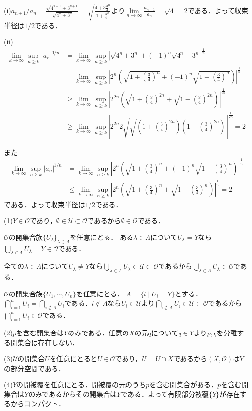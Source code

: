 \documentclass[
		book,
		head_space=20mm,
		foot_space=20mm,
		gutter=10mm,
		line_length=190mm
]{jlreq}
\begin{document}
(i)$a_{n+1}/a_n=\frac{\sqrt{4^{n+1}+3^{n+1}}}{\sqrt{4^{n}+3^{n}}}=\sqrt{\frac{4+3\frac{3}{4}^{n}}{1+\frac{3}{4}^{n}}}$より$\lim\limits_{n \to \infty} \frac{a_{n+1}}{a_n}=\sqrt{4}=2$である．よって収束半径は$1/2$である．

(ii)\begin{align}
    \lim\limits_{k \to \infty}\sup\limits_{n \ge k}{|a_n|}^{1/n}&=\lim\limits_{k \to \infty}\sup\limits_{n \ge k}\left|{\sqrt{4^{n}+3^{n}}+(-1)^{n}\sqrt{4^{n}-3^{n}}}\right|^\frac{1}{n}  \\
    &= \lim\limits_{k \to \infty}\sup\limits_{n \ge k}\left|{2^n(\sqrt{1+(\frac{3}{4})^n}+(-1)^n\sqrt{1-(\frac{3}{4})^n})}\right|^\frac{1}{n} \\
    &\ge \lim\limits_{k \to \infty}\sup\limits_{n \ge k}\left|{2^{2n}(\sqrt{1+(\frac{3}{4})^{2n}}+\sqrt{1-(\frac{3}{4})^{2n}})}\right|^\frac{1}{2n} \\
    &\ge \lim\limits_{k \to \infty}\sup\limits_{n \ge k}\left|{2^{2n}2\sqrt{\sqrt{(1+(\frac{3}{4})^{2n})(1-(\frac{3}{4})^{2n})}}}\right|^\frac{1}{2n} =2
\end{align}

また \begin{align}
    \lim\limits_{k \to \infty}\sup\limits_{n \ge k}{|a_n|}^{1/n}&= \lim\limits_{k \to \infty}\sup\limits_{n \ge k}\left|{2^n(\sqrt{1+(\frac{3}{4})^n}+(-1)^n\sqrt{1-(\frac{3}{4})^n})}\right|^\frac{1}{n} \\
    &\le \lim\limits_{k \to \infty}\sup\limits_{n \ge k}\left|{2^n(\sqrt{1+(\frac{3}{4})^n}+\sqrt{1-(\frac{3}{4})^n})}\right|^\frac{1}{n} = 2
\end{align}である．よって収束半径は$1/2$である．


(1)$Y \in \mathcal{O}$であり，$\emptyset \in \mathcal{U} \subset \mathcal{O}$であるから$\emptyset \in \mathcal{O}$である．

$\mathcal{O}$の開集合族$\{U_\lambda\}_{\lambda\in \Lambda}$を任意にとる．
ある$\lambda\in \Lambda$について$U_\lambda=Y$なら$\bigcup_{\lambda\in \Lambda}U_\lambda=Y \in \mathcal{O}$である．

全ての$\lambda \in \Lambda$について$U_\lambda \neq Y$なら$\bigcup_{\lambda\in \Lambda}U_\lambda \in \mathcal{U}\subset \mathcal{O}$であるから$\bigcup_{\lambda\in \Lambda}U_\lambda \in \mathcal{O}$である．

$\mathcal{O}$の開集合族$\{U_1,\cdots,U_n\}$を任意にとる．
$A=\{ i \mid U_i=Y\}$とする．$\bigcap\limits_{i=1}^n U_i=\bigcap\limits_{i\notin A}U_i $である．$i\notin A$なら$U_i \in \mathcal{U}$より$\bigcap\limits_{i\notin A}U_i  \in \mathcal{U}\subset \mathcal{O}$であるから$\bigcap\limits_{i=1}^n U_i \in \mathcal{O}$である．

(2)$p$を含む開集合は$Y$のみである．任意の$X$の元$q$について$q \in Y$より$p,q$を分離する開集合は存在しない．

(3)$\mathcal{U}$の開集合$U$を任意にとると$U \in \mathcal{O}$であり，$U=U \cap X$であるから$(X,\mathcal{O})$は$Y$の部分空間である．

(4)$Y$の開被覆を任意にとる．開被覆の元のうち$p$を含む開集合がある．$p$を含む開集合は$Y$のみであるからその開集合は$Y$である．よって有限部分被覆$\{Y\}$が存在するからコンパクト．
\end{document}
